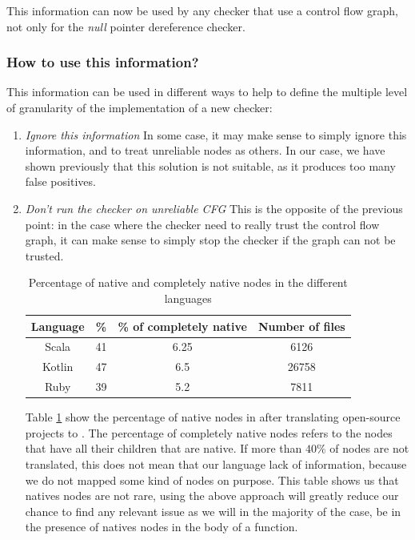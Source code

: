 This information can now be used by any checker that use a control flow graph, not only for the \emph{null} pointer dereference checker.

\subsubsection{How to use this information?}
\label{subsubsec:use_unreliable_information}

This information can be used in different ways to help to define the multiple level of granularity of the implementation of a new checker:

\begin{enumerate}
\item \textit{Ignore this information} \newline
In some case, it may make sense to simply ignore this information, and to treat unreliable nodes as others. 
In our case, we have shown previously that this solution is not suitable, as it produces too many false positives. \newline

\item \textit{Don’t run the checker on unreliable CFG} \newline
This is the opposite of the previous point: in the case where the checker need to really trust the control flow graph, it can make sense to simply stop the checker if the graph can not be trusted.

\begin{table}[h]
	\centering
	\caption{Percentage of native and completely native nodes in the different languages}
	\label{table:slang-native-percentage}
	\begin{tabular}{|c|c|c|c|}
		\hline
		\bf Language & \bf \% & \bf \% of completely native & \bf Number of files \\ \hline
		Scala &  41 &  6.25 & 6126 \\ 
		Kotlin &  47 &  6.5 & 26758 \\ 
		Ruby &  39 &  5.2 &  7811 \\ \hline
	\end{tabular}
\end{table}

Table \ref{table:slang-native-percentage} show the percentage of native nodes in \slang{} after translating open-source projects \cite{SlangSources:2019:Online} to \slang{}. The percentage of completely native nodes refers to the nodes that have all their children that are native. If more than $40\%$ of nodes are not translated, this does not mean that our language lack of information, because we do not mapped some kind of nodes on purpose.
This table shows us that natives nodes are not rare, using the above approach will greatly reduce our chance to find any relevant issue as we will in the majority of the case, be in the presence of natives nodes in the body of a function.


\end{enumerate}
